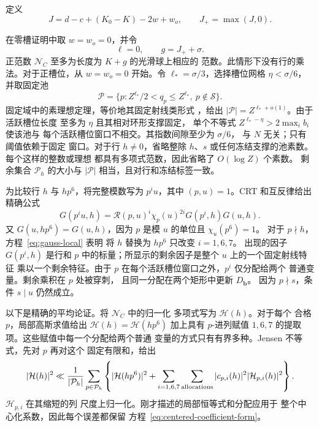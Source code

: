 \documentclass[11pt,a4paper]{article}
\numberwithin{equation}{section}
\numberwithin{figure}{section}
\theoremstyle{definition}
\theoremstyle{remark}
\begin{document}
定义
\begin{equation}
 J=d-c+(K_0-K)-2w+w_o,\qquad J_+=\max(J,0).
 \label{old-eq:2.8}
\end{equation}

在零槽证明中取 \(w=w_o=0\)，并令
\[
 \ell=0,\qquad g=J_++\sigma.
\]
正范数 \(\mathcal N_C\) 至多为长度为 \(K+g\) 的光滑球上相应的
范数。此情形下没有行的乘法。对于正槽位，从 \(w=w_o=0\) 开始。令
\(\ell_*=\sigma/3\)，选择槽位网格 \(\eta<\sigma/6\)，
并取固定池
\[
 \mathcal P=\{p: Z^{\ell_*}/2<q_p\le Z^{\ell_*},\
                    p\notin\mathcal S\}.
\]
固定域中的素理想定理，等价地其固定射线类形式 \cite[Theorem 1.1]{TZ}，给出
\(|\mathcal P|=Z^{\ell_*+o(1)}\)。由于活跃槽位长度
至多为 \(\eta\) 且其相对环形支撑固定，
单个不等式
\(Z^{\ell_*-\eta}>2\max_i b_i\) 使该池与
每个活跃槽位窗口不相交。其指数间隙至少为 \(\sigma/6\)，
与 \(N\) 无关；只有阈值依赖于固定
窗口。对于行 \(h\ne0\)，省略整除
\(h\)、\(s\) 或任何冻结支撑的池素数。每个这样的整数或理想
都具有多项式范数，因此省略了 \(O(\log Z)\) 个素数。
剩余集合 \(\mathcal P_h\) 的大小与
\(|\mathcal P|\) 相当，且对行和冻结标签一致。

为比较行 \(h\) 与 \(hp^6\)，将完整模数写为 \(p^iu\)，其中
\((p,u)=1\)。CRT 和互反律给出精确公式
\[
 G(p^iu,h)
 =\mathcal R(p,u)^i\chi_p(u)^{2i}G(p^i,h)G(u,h).
\]
又 \(G(u,hp^6)=G(u,h)\)，因为 \(p\) 是模 \(u\)
的单位且 \(\chi_u(p^6)=1\)。
对于 \(p\nmid h\)，方程~\eqref{eq:gauss-local} 表明
将 \(h\) 替换为 \(hp^6\) 只改变 \(i=1,6,7\)。
出现的因子 \(G(p^i,h)\) 是行和
\(p\) 中的标量；所显示的剩余因子是整个 \(u\) 上的一个固定射线特征
乘以一个剩余特征。由于 \(p\)
在每个活跃槽位窗口之外，\(p^i\) 仅分配给两个
普通变量。剩余乘积在 \(p\) 处被穿刺，
且同一分配在两个矩形中更新 \(D_{\mathbf b}\)。
因为 \(p\nmid s\)，条件 \(s\mid u\) 仍然成立。

以下是精确的平均论证。将 \(\mathcal N_C\) 中的归一化
多项式写为 \(\mathcal H(h)\)。对于每个
合格 \(p\)，局部高斯求值给出
\(\mathcal H(h)=\mathcal H(hp^6)\) 加上具有
\(p\)-进列赋值 \(1,6,7\) 的提取项。这些赋值中每一个分配给两个普通
变量的方式只有有界多种。Jensen 不等式，先对 \(p\) 再对这个
固定有限和，给出
\[
 |\mathcal H(h)|^2\ll
 \frac1{|\mathcal P_h|}\sum_{p\in\mathcal P_h}
 \left\{|\mathcal H(hp^6)|^2+
        \sum_{i=1,6,7}\sum_{\rm allocations}
        |c_{p,i}(h)|^2|\mathcal H_{p,i}(h)|^2\right\}.
\]
\(\mathcal H_{p,i}\) 在其缩短的列
尺度上归一化。刚才描述的局部恒等式和分配应用于
整个中心化系数，因此每个误差都保留
方程~\eqref{eq:centered-coefficient-form}。
\end{document}
